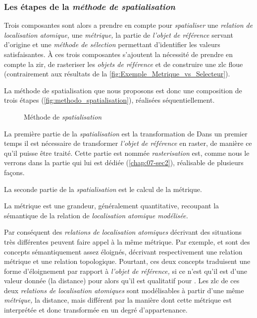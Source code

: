 \subsubsection{Les étapes de la \emph{méthode de spatialisation}}

Trois composantes sont alors a prendre en compte pour \emph{spatialiser} une \emph{relation de localisation atomique,} une \emph{métrique,} la partie de \emph{l'objet de référence} servant d'origine et une \emph{méthode de sélection} permettant d'identifier les valeurs satisfaisantes.
%
À ces trois composantes s'ajoutent la nécessité de prendre en compte la \ac{zir}, de rasteriser les \emph{objets de référence} et de construire une \ac{zlc} floue (contrairement aux résultats de la \autoref{fig:Exemple_Metrique_vs_Selecteur}).



La méthode de spatialisation que nous proposons est donc une composition de trois étapes (\autoref{fig:methodo_spatialisation}), réalisées séquentiellement.

\begin{figure}
  \centering
  
  \caption{Méthode de \emph{spatialisation}}
  \label{fig:methodo_spatialisation}
\end{figure}

%
La première partie de la \emph{spatialisation} est la transformation de 
Dans un premier temps il est nécessaire de transformer \emph{l'objet de référence} en raster, de manière ce qu'il puisse être traité. Cette partie est nommée \emph{rasterisation} est, comme nous le verrons dans la partie qui lui est dédiée (\autoref{chap:07-sec2}), réalisable de plusieurs façons.

%
La seconde partie de la \emph{spatialisation} est le calcul de la métrique.

La métrique est une grandeur, généralement quantitative, recoupant la sémantique de la relation de \emph{localisation atomique modélisée.}

Par conséquent des \emph{relations de localisation atomiques} décrivant des situations très différentes peuvent faire appel à la même métrique.
%
Par exemple,  et  sont des concepts sémantiquement assez éloignés, décrivant respectivement une relation métrique et une relation topologique. Pourtant, ces deux concepts traduisent une forme d'éloignement par rapport à \emph{l'objet de référence,} si ce n'est qu'il est d'une valeur donnée (\ie la distance) pour  alors qu'il est qualitatif pour . Les \ac{zlc} de ces deux \emph{relations de localisation atomiques} sont modélisables à partir d'une même \emph{métrique,} la distance, mais différent par la manière dont cette métrique est interprétée et donc transformée en un degré d'appartenance.

